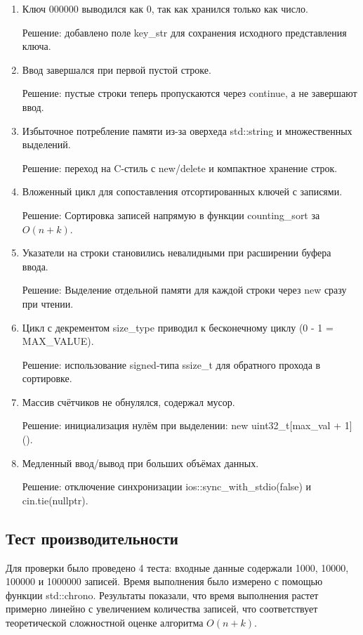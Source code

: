\documentclass[12pt]{article}
\begin{document}
\begin{enumerate}

\item Ключ 000000 выводился как 0, так как хранился только как число.

Решение: добавлено поле key\_str для сохранения исходного представления ключа.

\item Ввод завершался при первой пустой строке.

Решение: пустые строки теперь пропускаются через continue, а не завершают ввод.

\item Избыточное потребление памяти из-за оверхеда std::string и множественных выделений.

Решение: переход на C-стиль с new/delete и компактное хранение строк.

\item Вложенный цикл для сопоставления отсортированных ключей с записями.

Решение: Сортировка записей напрямую в функции counting\_sort за $O(n + k)$.

\item Указатели на строки становились невалидными при расширении буфера ввода.

Решение: Выделение отдельной памяти для каждой строки через new сразу при чтении.

\item Цикл с декрементом size\_type приводил к бесконечному циклу (0 - 1 = MAX\_VALUE).

Решение: использование signed-типа ssize\_t для обратного прохода в сортировке.

\item Массив счётчиков не обнулялся, содержал мусор.

Решение: инициализация нулём при выделении: new uint32\_t[max\_val + 1]().

\item Медленный ввод/вывод при больших объёмах данных.

Решение: отключение синхронизации ios::sync\_with\_stdio(false) и cin.tie(nullptr).
\end{enumerate}

\subsection*{Тест производительности}

Для проверки было проведено 4 теста: входные данные содержали 1000, 10000, 100000 и 1000000 записей.
Время выполнения было измерено с помощью функции std::chrono.
Результаты показали, что время выполнения растет примерно линейно с увеличением количества записей, что соответствует теоретической сложностной оценке алгоритма $O(n + k)$.
\end{document}

